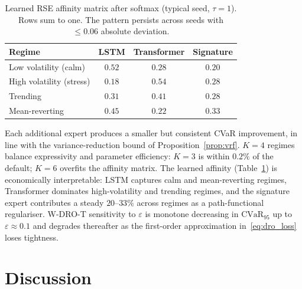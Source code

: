 \documentclass[10pt,letterpaper]{article}
\newcommand{\cvar}{\mathrm{CVaR}}
\begin{document}
\begin{table}[ht]
\centering\small
\caption{Learned RSE affinity matrix after softmax (typical seed,
$\tau=1$). Rows sum to one. The pattern persists across seeds with
$\le 0.06$ absolute deviation.}
\label{tab:affinity}
\begin{tabular}{@{}lccc@{}}
\toprule
\textbf{Regime}        & \textbf{LSTM} & \textbf{Transformer} & \textbf{Signature} \\\midrule
Low volatility (calm)  & $\mathbf{0.52}$ & $0.28$         & $0.20$ \\
High volatility (stress)& $0.18$        & $\mathbf{0.54}$ & $0.28$ \\
Trending               & $0.31$        & $\mathbf{0.41}$ & $0.28$ \\
Mean-reverting         & $\mathbf{0.45}$ & $0.22$         & $0.33$ \\
\bottomrule
\end{tabular}
\end{table}

Each additional expert produces a smaller but consistent CVaR
improvement, in line with the variance-reduction bound of
Proposition~\ref{prop:vrf}. $K=4$ regimes balance expressivity and
parameter efficiency: $K=3$ is within $0.2\%$ of the default; $K=6$
overfits the affinity matrix. The learned affinity
(Table~\ref{tab:affinity}) is economically interpretable: LSTM
captures calm and mean-reverting regimes, Transformer dominates
high-volatility and trending regimes, and the signature expert
contributes a steady $20$--$33\%$ across regimes as a
path-functional regulariser. W-DRO-T sensitivity to $\varepsilon$
is monotone decreasing in $\cvar_{95}$ up to $\varepsilon\approx 0.1$
and degrades thereafter as the first-order approximation
in~\eqref{eq:dro_loss} loses tightness.

\section{Discussion}\label{sec:discussion}
\end{document}
